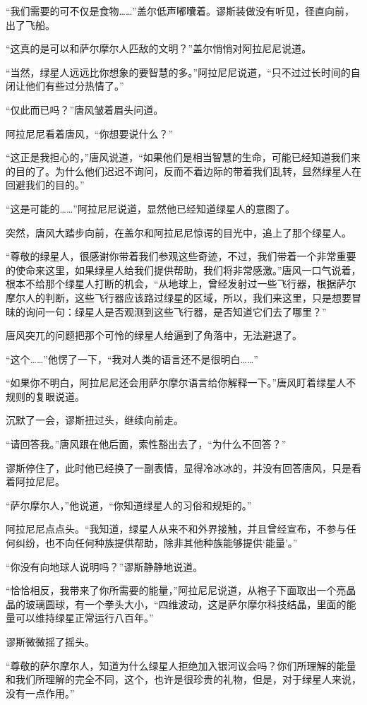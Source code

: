 “我们需要的可不仅是食物……”盖尔低声嘟囔着。谬斯装做没有听见，径直向前，出了飞船。

“这真的是可以和萨尔摩尔人匹敌的文明？”盖尔悄悄对阿拉尼尼说道。

“当然，绿星人远远比你想象的要智慧的多。”阿拉尼尼说道，“只不过过长时间的自闭让他们有些过分热情了。”

“仅此而已吗？”唐风皱着眉头问道。

阿拉尼尼看着唐风，“你想要说什么？”

“这正是我担心的，”唐风说道，“如果他们是相当智慧的生命，可能已经知道我们来的目的了。为什么他们迟迟不询问，反而不着边际的带着我们乱转，显然绿星人在回避我们的目的。”

“这是可能的……”阿拉尼尼说道，显然他已经知道绿星人的意图了。

突然，唐风大踏步向前，在盖尔和阿拉尼尼惊谔的目光中，追上了那个绿星人。

“尊敬的绿星人，很感谢你带着我们参观这些奇迹，不过，我们带着一个非常重要的使命来这里，如果绿星人给我们提供帮助，我们将非常感激。”唐风一口气说着，根本不给那个绿星人打断的机会，“从地球上，曾经发射过一些飞行器，根据萨尔摩尔人的判断，这些飞行器应该路过绿星的区域，所以，我们来这里，只是想要冒昧的询问一句：绿星人是否观测到这些飞行器，是否知道它们去了哪里？”

唐风突兀的问题把那个可怜的绿星人给逼到了角落中，无法避退了。

“这个……”他愣了一下，“我对人类的语言还不是很明白……”

“如果你不明白，阿拉尼尼还会用萨尔摩尔语言给你解释一下。”唐风盯着绿星人不规则的复眼说道。

沉默了一会，谬斯扭过头，继续向前走。

“请回答我。”唐风跟在他后面，索性豁出去了，“为什么不回答？”

谬斯停住了，此时他已经换了一副表情，显得冷冰冰的，并没有回答唐风，只是看着阿拉尼尼。

“萨尔摩尔人，”他说道，“你知道绿星人的习俗和规矩的。”

阿拉尼尼点点头。“我知道，绿星人从来不和外界接触，并且曾经宣布，不参与任何纠纷，也不向任何种族提供帮助，除非其他种族能够提供‘能量’。”

“你没有向地球人说明吗？”谬斯静静地说道。

“恰恰相反，我带来了你所需要的能量，”阿拉尼尼说道，从袍子下面取出一个亮晶晶的玻璃圆球，有一个拳头大小，“四维波动，这是萨尔摩尔科技结晶，里面的能量可以维持绿星正常运行八百年。”

谬斯微微摇了摇头。

“尊敬的萨尔摩尔人，知道为什么绿星人拒绝加入银河议会吗？你们所理解的能量和我们所理解的完全不同，这个，也许是很珍贵的礼物，但是，对于绿星人来说，没有一点作用。”

